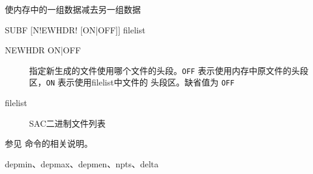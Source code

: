 \label{cmd:subf}

使内存中的一组数据减去另一组数据

\begin{SACSTX}
SUBF [N!EWHDR! [ON|OFF]] filelist
\end{SACSTX}

\begin{description}
\item [NEWHDR ON|OFF] 指定新生成的文件使用哪个文件的头段。\texttt{OFF}
    表示使用内存中原文件的头段区，\texttt{ON} 表示使用filelist中文件的
    头段区。缺省值为 \texttt{OFF}
\item [filelist] SAC二进制文件列表
\end{description}

参见  命令的相关说明。

depmin、depmax、depmen、npts、delta
